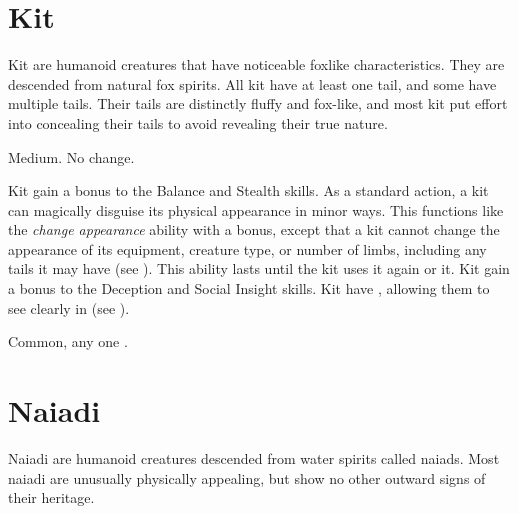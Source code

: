 \section{Kit}

  Kit are humanoid creatures that have noticeable foxlike characteristics.
  They are descended from natural fox spirits.
  All kit have at least one tail, and some have multiple tails.
  Their tails are distinctly fluffy and fox-like, and most kit put effort into concealing their tails to avoid revealing their true nature.

   Medium.
   No change.
  \begin{itemize}
     Kit gain a  bonus to the Balance and Stealth skills.
     As a standard action, a kit can magically disguise its physical appearance in minor ways.
      This functions like the \textit{change appearance} ability with a  bonus, except that a kit cannot change the appearance of its equipment, creature type, or number of limbs, including any tails it may have (see ).
      This ability lasts until the kit uses it again or  it.
     Kit gain a  bonus to the Deception and Social Insight skills.
     Kit have , allowing them to see clearly in  (see ).
  \end{itemize}
   Common, any one .

\section{Naiadi}
  Naiadi are humanoid creatures descended from water spirits called naiads.
  Most naiadi are unusually physically appealing, but show no other outward signs of their heritage.

